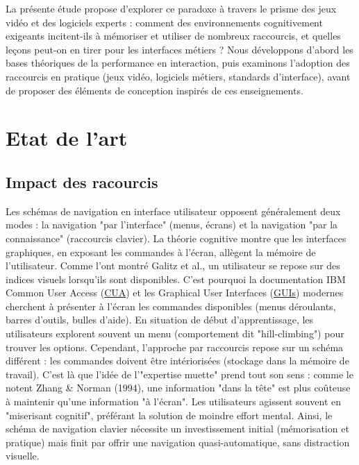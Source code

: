 \documentclass[a4paper,12pt]{article}
\begin{document}
La présente étude propose d'explorer ce paradoxe à travers le prisme des jeux vidéo et des logiciels experts : comment des environnements cognitivement exigeants incitent-ils à mémoriser et utiliser de nombreux raccourcis, et quelles leçons peut-on en tirer pour les interfaces métiers ? Nous développons d'abord les bases théoriques de la performance en interaction, puis examinons l'adoption des raccourcis en pratique (jeux vidéo, logiciels métiers, standards d'interface), avant de proposer des éléments de conception inspirés de ces enseignements.
\section{Etat de l'art}
\label{sec:orgefaf787}
\subsection{Impact des racourcis}
\label{sec:org9a461ac}
Les schémas de navigation en interface utilisateur opposent généralement deux modes : la navigation "par l'interface" (menus, écrans) et la navigation "par la connaissance" (raccourcis clavier). La théorie cognitive montre que les interfaces graphiques, en exposant les commandes à l'écran, allègent la mémoire de l'utilisateur\autocite{peresKeyboardShortcutUsage2004}. Comme l’ont montré Galitz et al., un utilisateur se repose sur des indices visuels lorsqu’ils sont disponibles\autocite{peresKeyboardShortcutUsage2004}. C’est pourquoi la documentation IBM Common User Access
 (\protect\hyperlink{gls-1}{\label{gls-1-use-1}CUA}) et les Graphical User Interfaces (\protect\hyperlink{gls-2}{\label{gls-2-use-1}GUIs}) modernes cherchent à présenter à l'écran les commandes disponibles (menus déroulants, barres d'outils, bulles d’aide). En situation de début d'apprentissage, les utilisateurs explorent souvent un menu (comportement dit "hill-climbing") pour trouver les options\autocite{peresKeyboardShortcutUsage2004}. Cependant, l’approche par raccourcis repose sur un schéma différent : les commandes doivent être intériorisées (stockage dans la mémoire de travail). C’est là que l'idée de l'"expertise muette" prend tout son sens : comme le notent Zhang \& Norman (1994), une information "dans la tête" est plus coûteuse à maintenir qu'une information "à l'écran". Les utilisateurs agissent souvent en "miserisant cognitif", préférant la solution de moindre effort mental\autocite{peresKeyboardShortcutUsage2004}. Ainsi, le schéma de navigation clavier nécessite un investissement initial (mémorisation et pratique) mais finit par offrir une navigation quasi-automatique, sans distraction visuelle.
\end{document}
